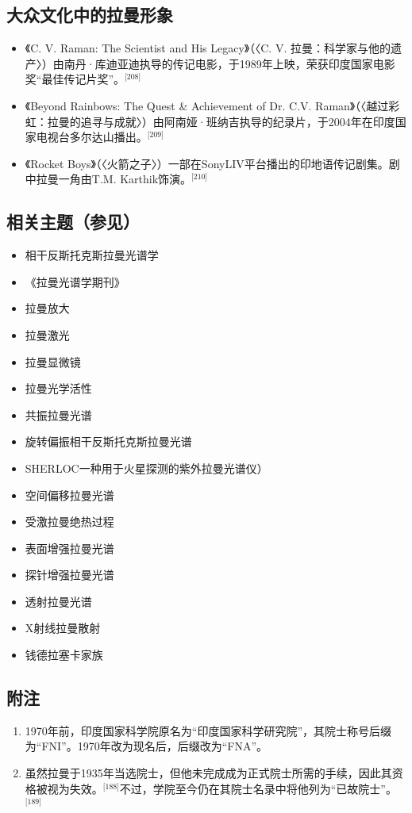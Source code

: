 \subsection{大众文化中的拉曼形象}
\begin{itemize}
\item 《C. V. Raman: The Scientist and His Legacy》（〈C. V. 拉曼：科学家与他的遗产〉）由南丹·库迪亚迪执导的传记电影，于1989年上映，荣获印度国家电影奖“最佳传记片奖”。\(^\text{[208]}\)
\item 《Beyond Rainbows: The Quest & Achievement of Dr. C.V. Raman》（〈越过彩虹：拉曼的追寻与成就〉）由阿南娅·班纳吉执导的纪录片，于2004年在印度国家电视台多尔达山播出。\(^\text{[209]}\)
\item 《Rocket Boys》（〈火箭之子〉）一部在SonyLIV平台播出的印地语传记剧集。剧中拉曼一角由T.M. Karthik饰演。\(^\text{[210]}\)
\end{itemize}
\subsection{相关主题（参见）}
\begin{itemize}
\item 相干反斯托克斯拉曼光谱学
\item 《拉曼光谱学期刊》
\item 拉曼放大
\item 拉曼激光
\item 拉曼显微镜
\item 拉曼光学活性
\item 共振拉曼光谱
\item 旋转偏振相干反斯托克斯拉曼光谱
\item SHERLOC一种用于火星探测的紫外拉曼光谱仪）
\item 空间偏移拉曼光谱
\item 受激拉曼绝热过程
\item 表面增强拉曼光谱
\item 探针增强拉曼光谱
\item 透射拉曼光谱
\item X射线拉曼散射
\item 钱德拉塞卡家族
\end{itemize}
\subsection{附注}
\begin{enumerate}
\item 1970年前，印度国家科学院原名为“印度国家科学研究院”，其院士称号后缀为“FNI”。1970年改为现名后，后缀改为“FNA”。
\item 虽然拉曼于1935年当选院士，但他未完成成为正式院士所需的手续，因此其资格被视为失效。\(^\text{[188]}\)不过，学院至今仍在其院士名录中将他列为“已故院士”。\(^\text{[189]}\)
\end{enumerate}
